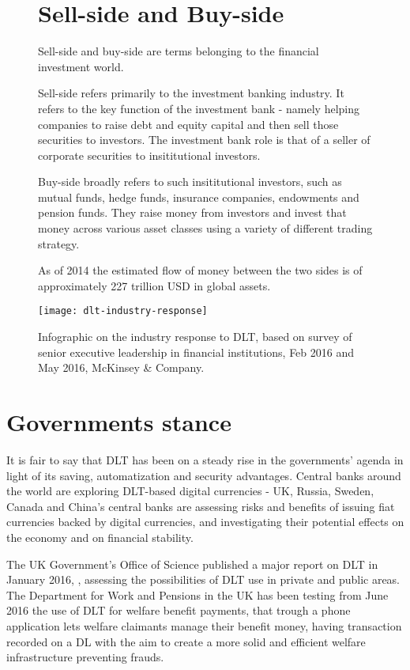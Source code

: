 \begin{figure}[b]
    \begin{tcolorbox}[colframe=boxcolor]
        \section*{Sell-side and Buy-side}
        Sell-side and buy-side are terms belonging to the financial investment world.

        Sell-side refers primarily to the investment banking industry. It refers to the key function of the investment bank - namely helping companies to raise debt and equity capital and then sell those securities to investors. The investment bank role is that of a seller of corporate securities to insititutional investors.

        Buy-side broadly refers to such insititutional investors, such as mutual funds, hedge funds, insurance companies, endowments and pension funds. They raise money from investors and invest that money across various asset classes using a variety of different trading strategy.

        As of 2014 the estimated flow of money between the two sides is of approximately 227 trillion USD in global assets.
    \end{tcolorbox}
\end{figure}

\begin{figure}[t]
    \centering
    \texttt{[image: dlt-industry-response]}
    \caption{
        Infographic on the industry response to DLT, based on survey of senior executive leadership in financial institutions, Feb 2016 and May 2016, McKinsey \& Company.
        }
\end{figure}

\section{Governments stance}


It is fair to say that DLT has been on a steady rise in the governments' agenda in light of its saving, automatization and security advantages.
Central banks around the world are exploring DLT-based digital currencies - UK, Russia, Sweden, Canada and China's central banks are assessing risks and benefits of issuing fiat currencies backed by digital currencies, and investigating their potential effects on the economy and on financial stability.

The UK Government's Office of Science published a major report on DLT in January 2016, \cite{ukgovdltpaper}, assessing the possibilities of DLT use in private and public areas. The Department for Work and Pensions in the UK has been testing from June 2016 the use of DLT for welfare benefit payments, that trough a phone application lets welfare claimants manage their benefit money, having transaction recorded on a DL with the aim to create a more solid and efficient welfare infrastructure preventing frauds.

